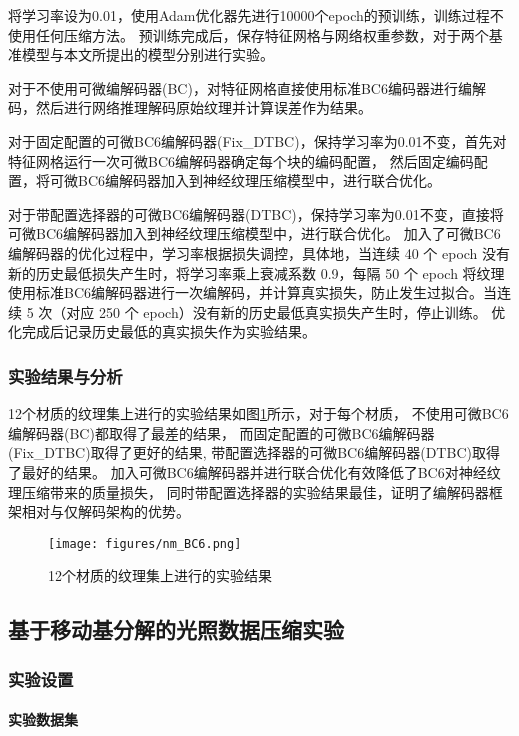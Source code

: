 将学习率设为0.01，使用Adam优化器先进行10000个epoch的预训练，训练过程不使用任何压缩方法。
预训练完成后，保存特征网格与网络权重参数，对于两个基准模型与本文所提出的模型分别进行实验。

对于不使用可微编解码器(BC)，对特征网格直接使用标准BC6编码器进行编解码，然后进行网络推理解码原始纹理并计算误差作为结果。

对于固定配置的可微BC6编解码器(Fix\_DTBC)，保持学习率为0.01不变，首先对特征网格运行一次可微BC6编解码器确定每个块的编码配置，
然后固定编码配置，将可微BC6编解码器加入到神经纹理压缩模型中，进行联合优化。

对于带配置选择器的可微BC6编解码器(DTBC)，保持学习率为0.01不变，直接将可微BC6编解码器加入到神经纹理压缩模型中，进行联合优化。
加入了可微BC6编解码器的优化过程中，学习率根据损失调控，具体地，当连续 40 个 epoch 没有新的历史最低损失产生时，将学习率乘上衰减系数 0.9，每隔 50 个 epoch 将纹理使用标准BC6编解码器进行一次编解码，并计算真实损失，防止发生过拟合。当连续 5 次（对应 250 个 epoch）没有新的历史最低真实损失产生时，停止训练。
优化完成后记录历史最低的真实损失作为实验结果。

\subsubsection{实验结果与分析}

12个材质的纹理集上进行的实验结果如图\ref{fig:nm_BC6}所示，对于每个材质，
不使用可微BC6编解码器(BC)都取得了最差的结果，
而固定配置的可微BC6编解码器(Fix\_DTBC)取得了更好的结果,
带配置选择器的可微BC6编解码器(DTBC)取得了最好的结果。
加入可微BC6编解码器并进行联合优化有效降低了BC6对神经纹理压缩带来的质量损失，
同时带配置选择器的实验结果最佳，证明了编解码器框架相对与仅解码架构的优势。


\begin{figure}[htbp]
    \centering
    \texttt{[image: figures/nm\_BC6.png]}
    \caption{12个材质的纹理集上进行的实验结果}
    \label{fig:nm_BC6}
\end{figure}


\subsection{基于移动基分解的光照数据压缩实验}

\subsubsection{实验设置}

\paragraph{实验数据集}


